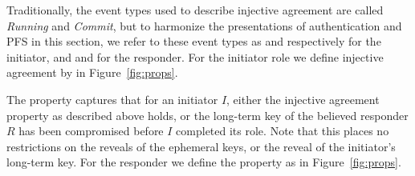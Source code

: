 Traditionally, the event types used to describe injective agreement are called
\emph{Running} and \emph{Commit}, but to harmonize the presentations of
authentication and PFS in this section, we refer to these event types as
\mIStart{} and \mIComplete{} respectively for the initiator, and
\mRStart{} and \mRComplete{} for the responder.
%
For the initiator role we define injective agreement by
\mPredInjI{} in Figure~\ref{fig:props}.

%
The property captures that for an initiator $I$, either the injective agreement
property as described above holds, or the long-term key of the believed
responder $R$ has been compromised before $I$ completed its role.
%
Note that this places no restrictions on the reveals of the ephemeral
keys, or the reveal of the initiator's long-term key.
%
For the responder we define the property \mPredInjR{} as in
Figure~\ref{fig:props}.
%

